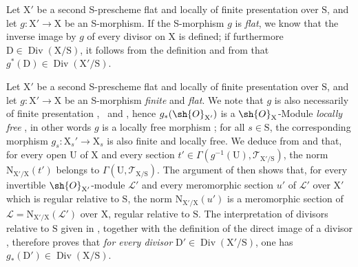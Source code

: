 \begin{env}[21.15.7]
\label{IV.21.15.7}
Let $\mathrm{X}'$ be a second S-prescheme flat and locally of finite presentation over $\mathrm{S}$, and let $g:\mathrm{X}'\to\mathrm{X}$ be an S-morphism.
If the S-morphism $g$ is \emph{flat}, we know  that the inverse image by $g$ of every divisor on $\mathrm{X}$ is defined; if furthermore $\mathrm{D}\in\operatorname{Div}(\mathrm{X}/\mathrm{S})$, it follows from the definition  and from  that $g^*(\mathrm{D})\in\operatorname{Div}(\mathrm{X}'/\mathrm{S})$.
\end{env}

\begin{env}[21.15.8]
\label{IV.21.15.8}
Let $\mathrm{X}'$ be a second S-prescheme flat and locally of finite presentation over $\mathrm{S}$, and let $g:\mathrm{X}'\to\mathrm{X}$ be an S-morphism \emph{finite} and \emph{flat}.
We note that $g$ is also necessarily of finite presentation ,~ and , hence $g_*(\sh{O}_{\mathrm{X}'})$ is a $\sh{O}_{\mathrm{X}}$-Module \emph{locally free} , in other words $g$ is a locally free morphism ; for all $s\in\mathrm{S}$, the corresponding morphism $g_s:\mathrm{X}_s'\to\mathrm{X}_s$ is also finite and locally free.
We deduce from  and  that, for every open $\mathrm{U}$ of $\mathrm{X}$ and every section $t'\in\Gamma(g^{-1}(\mathrm{U}),\mathscr{T}_{\mathrm{X}'/\mathrm{S}})$, the norm $\mathrm{N}_{\mathrm{X}'/\mathrm{X}}(t')$ belongs to $\Gamma(\mathrm{U},\mathscr{T}_{\mathrm{X}/\mathrm{S}})$. The argument of  then shows that, for every invertible $\sh{O}_{\mathrm{X}'}$-module $\mathscr{L}'$ and every meromorphic section $u'$ of $\mathscr{L}'$ over $\mathrm{X}'$ which is regular relative to $\mathrm{S}$, the norm $\mathrm{N}_{\mathrm{X}'/\mathrm{X}}(u')$ is a meromorphic section of $\mathscr{L}=\mathrm{N}_{\mathrm{X}'/\mathrm{X}}(\mathscr{L}')$ over $\mathrm{X}$, regular relative to $\mathrm{S}$.
The interpretation of divisors relative to $\mathrm{S}$ given in , together with the definition of the direct image of a divisor , therefore proves that \emph{for every divisor} $\mathrm{D}'\in\operatorname{Div}(\mathrm{X}'/\mathrm{S})$, one has $g_*(\mathrm{D}')\in\operatorname{Div}(\mathrm{X}/\mathrm{S})$.
\end{env}

